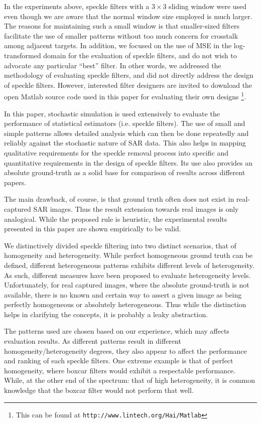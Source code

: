 \documentclass[journal]{IEEEtran}
\begin{document}
In the experiments above, speckle filters with a $3 \times 3$ sliding window were used 
	even though we are aware that the normal window size employed is much larger. 
The reasons for maintaining such a small window is that 
	smaller-sized filters facilitate the use of smaller patterns without too much concern for crosstalk 
	among adjacent targets.
In addition, we focused on the use of MSE in the log-transformed domain for the evaluation of speckle filters, 
	and do not wish to advocate any particular ``best'' filter. 
In other words, we addressed the methodology of evaluating speckle filters, 
	and did not directly address the design of speckle filters.
However, interested filter designers are invited to download the open Matlab source code used in this paper 
for evaluating their own designs
  \footnote{This can be found at \texttt{http://www.lintech.org/Hai/Matlab}}.

In this paper, stochastic simulation is used extensively to evaluate the performance of statistical estimators 
(i.e. speckle filters).
The use of small and simple patterns allows detailed analysis
  which can then be done repeatedly and reliably against the 
stochastic nature of SAR data.
This also helps in mapping qualitative requirements for the speckle removal process into specific and quantitative 
requirements in the design of speckle filters.
Its use also provides an absolute ground-truth as a solid base for comparison of results across different papers.

The main drawback, of course, is that ground truth often does not exist in real-captured SAR images.
Thus the result extension towards real images is only analogical.
While the proposed rule is heuristic, 
	the experimental results presented in this paper are shown empirically to be valid.

We distinctively divided speckle filtering into two distinct scenarios, that of homogeneity and heterogeneity.
While perfect homogeneous ground truth can be defined, 
	different heterogeneous patterns exhibits different levels of heterogeneity. 
As such, different measures have been proposed to evaluate heterogeneity levels.
Unfortunately, for real captured images, where the absolute ground-truth is not available, 
	there is no known and certain way to assert a given image as being perfectly homogeneous or 
	absolutely heterogeneous.
Thus while the distinction helps in clarifying the concepts, 
	it is probably a leaky abstraction.

The patterns used are chosen based on our experience, which may affects evaluation results. 
As different patterns result in different homogeneity/heterogeneity degrees, 
	they also appear to affect the performance and ranking of each speckle filters.
One extreme example is that of perfect homogeneity, where boxcar filters would exhibit a respectable performance.
While, at the other end of the spectrum: that of high heterogeneity, it is common knowledge that the boxcar filter 
	would not perform that well.
\end{document}
